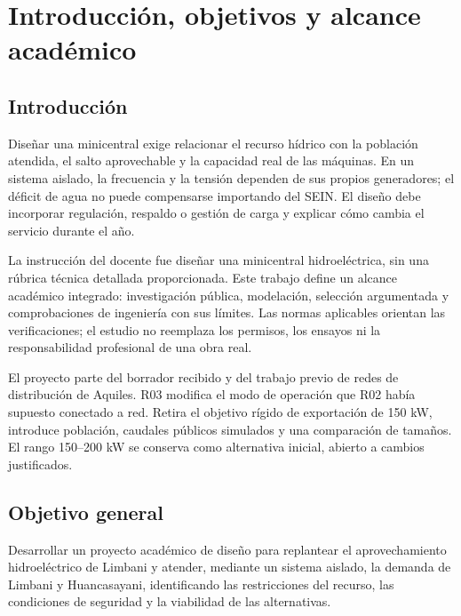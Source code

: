 \chapter{Introducción, objetivos y alcance académico}
\section{Introducción}
Diseñar una minicentral exige relacionar el recurso hídrico con la población atendida, el salto aprovechable y la capacidad real de las máquinas. En un sistema aislado, la frecuencia y la tensión dependen de sus propios generadores; el déficit de agua no puede compensarse importando del SEIN. El diseño debe incorporar regulación, respaldo o gestión de carga y explicar cómo cambia el servicio durante el año.

La instrucción del docente fue diseñar una minicentral hidroeléctrica, sin una rúbrica técnica detallada proporcionada. Este trabajo define un alcance académico integrado: investigación pública, modelación, selección argumentada y comprobaciones de ingeniería con sus límites. Las normas aplicables orientan las verificaciones; el estudio no reemplaza los permisos, los ensayos ni la responsabilidad profesional de una obra real.

El proyecto parte del borrador recibido y del trabajo previo de redes de distribución de Aquiles. R03 modifica el modo de operación que R02 había supuesto conectado a red. Retira el objetivo rígido de exportación de 150 kW, introduce población, caudales públicos simulados y una comparación de tamaños. El rango 150--200 kW se conserva como alternativa inicial, abierto a cambios justificados.

\section{Objetivo general}
Desarrollar un proyecto académico de diseño para replantear el aprovechamiento hidroeléctrico de Limbani y atender, mediante un sistema aislado, la demanda de Limbani y Huancasayani, identificando las restricciones del recurso, las condiciones de seguridad y la viabilidad de las alternativas.

